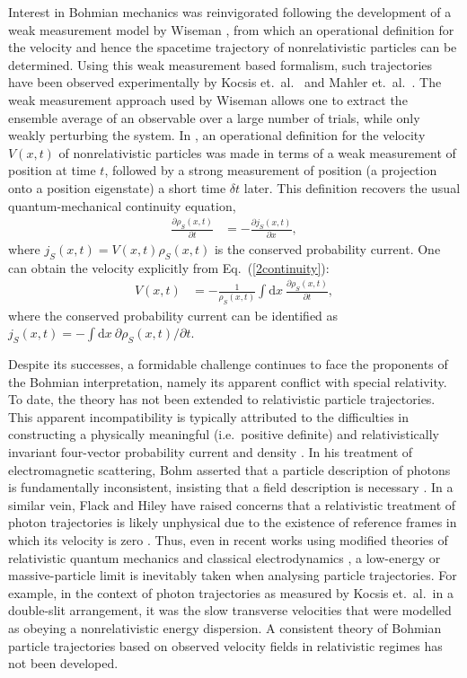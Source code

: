 \documentclass[12pt,prx,
,nofootinbib
,floatfix
,superscriptaddress
]{revtex4-2}
\newcommand{\p}{\partial}
\newcommand{\D}{\mathrm{d}}
\begin{document}
Interest in Bohmian mechanics was reinvigorated following the development of a weak measurement model by Wiseman \cite{Wiseman_2007}, from which an operational definition for the velocity and hence the spacetime trajectory of nonrelativistic particles can be determined. Using this weak measurement based formalism, such trajectories have been observed experimentally by Kocsis et.\ al.\  \cite{kocsis2011observing} and Mahler et.\ al.\ \cite{mahler2016experimental}. The weak measurement approach used by Wiseman allows one to extract the ensemble average of an observable over a large number of trials, while only weakly perturbing the system. In \cite{Wiseman_2007}, an operational definition for the velocity $V(x,t)$ of nonrelativistic particles was made in terms of a weak measurement of position at time $t$, followed by a strong measurement of position (a projection onto a position eigenstate) a short time $\delta t$ later. This definition recovers the usual quantum-mechanical continuity equation, 
\begin{align}\label{2continuity}
    \frac{\p \rho_S(x,t)}{\p t} &= - \frac{\p j_S(x,t) }{\p x} ,
\end{align}
where $j_S(x,t) = V(x,t) \rho_S(x,t)$ is the conserved probability current. One can obtain the velocity explicitly from Eq.\ (\ref{2continuity}):
\begin{align}\label{3velocity}
    V(x,t) &= - \frac{1}{\rho_S(x,t)} \int\D x \: \frac{\p \rho_S(x,t)}{\p t}, 
\end{align}
where the conserved probability current can be identified as $j_S(x,t) = - \int\D x \: \p \rho_S(x,t)/\p t$. 

Despite its successes, a formidable challenge continues to face the proponents of the Bohmian interpretation, namely its apparent conflict with special relativity. To date, the theory has not been extended to relativistic particle trajectories. This apparent incompatibility is typically attributed to the difficulties in constructing a physically meaningful (i.e.\ positive definite) and relativistically invariant four-vector probability current and density \cite{BOHM1987321,Struyve:2004xd}. In his treatment of electromagnetic scattering, Bohm asserted that a particle description of photons is fundamentally inconsistent, insisting that a field description is necessary \cite{BOHM1987321}. In a similar vein, Flack and Hiley have raised concerns that a relativistic treatment of photon trajectories is likely unphysical due to the existence of reference frames in which its velocity is zero \cite{flack_hiley_2015}. Thus, even in recent works using modified theories of relativistic quantum mechanics \cite{Ghose_2001,Jalalzadeh_2019} and classical electrodynamics \cite{Davidovi__2009,SANZ2010763}, a low-energy or massive-particle limit is inevitably taken when analysing particle trajectories. For example, in the context of photon trajectories as measured by Kocsis et.\ al.\ in a double-slit arrangement, it was the slow transverse velocities that were modelled as obeying a nonrelativistic energy dispersion. A consistent theory of Bohmian particle trajectories based on observed velocity fields in relativistic regimes has not been developed. 
\end{document}
